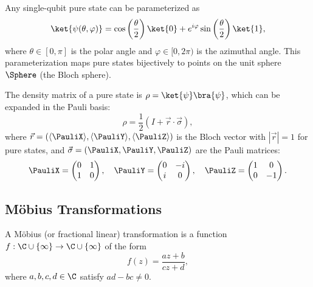\begin{definition}
Any single-qubit pure state can be parameterized as
\begin{equation}
    \ket{\psi(\theta, \varphi)} = \cos\left(\frac{\theta}{2}\right)\ket{0} + e^{i\varphi}\sin\left(\frac{\theta}{2}\right)\ket{1},
\end{equation}
where $\theta \in [0,\pi]$ is the polar angle and $\varphi \in [0, 2\pi)$ is the azimuthal angle. This parameterization maps pure states bijectively to points on the unit sphere $\Sphere$ (the Bloch sphere).
\end{definition}

The density matrix of a pure state is $\rho = \ket{\psi}\bra{\psi}$, which can be expanded in the Pauli basis:
\begin{equation}
    \rho = \frac{1}{2}(I + \vec{r} \cdot \vec{\sigma}),
\end{equation}
where $\vec{r} = (\langle \PauliX \rangle, \langle \PauliY \rangle, \langle \PauliZ \rangle)$ is the Bloch vector with $|\vec{r}| = 1$ for pure states, and $\vec{\sigma} = (\PauliX, \PauliY, \PauliZ)$ are the Pauli matrices:
\begin{equation}
    \PauliX = \begin{pmatrix} 0 & 1 \\ 1 & 0 \end{pmatrix}, \quad
    \PauliY = \begin{pmatrix} 0 & -i \\ i & 0 \end{pmatrix}, \quad
    \PauliZ = \begin{pmatrix} 1 & 0 \\ 0 & -1 \end{pmatrix}.
\end{equation}

\subsection{Möbius Transformations}

\begin{definition}
A Möbius (or fractional linear) transformation is a function $f: \C \cup \{\infty\} \to \C \cup \{\infty\}$ of the form
\begin{equation}
    f(z) = \frac{az + b}{cz + d},
\end{equation}
where $a,b,c,d \in \C$ satisfy $ad - bc \neq 0$.
\end{definition}

